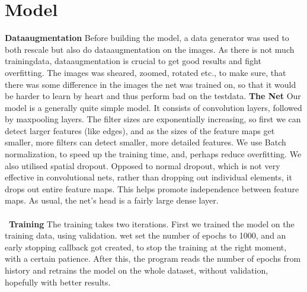 \section{Model}
\textbf{Dataaugmentation}
Before building the model, a data generator was used to both rescale but also do dataaugmentation on the images. As there is not much trainingdata, dataaugmentation is crucial to get good results and fight overfitting. The images was sheared, zoomed, rotated etc., to make sure, that there was some difference in the images the net was trained on, so that it would be harder to learn by heart and thus perform bad on the testdata.  
\newline
\newline
\textbf{The Net}
\newline
Our model is a generally quite simple model. It consists of convolution layers, followed by maxpooling layers. The filter sizes are exponentially increasing, so first we can detect larger features (like edges), and as the sizes of the feature maps get smaller, more filters can detect smaller, more detailed features. We use Batch normalization, to speed up the training time, and, perhaps reduce overfitting. We also utilised spatial dropout. Opposed to normal dropout, which is not very effective in convolutional nets, rather than dropping out individual elements, it drops out entire feature maps. This helps promote independence between feature maps. As usual, the net’s head is a fairly large dense layer.
\\\
\\\
\textbf{Training}
\newline
The training takes two iterations. First we trained the model on the training data, using validation. wet set the number of epochs to 1000, and an early stopping callback got created, to stop the training at the right moment, with a certain patience. After this, the program reads the number of epochs from history and retrains the model on the whole dataset, without validation, hopefully with better results.